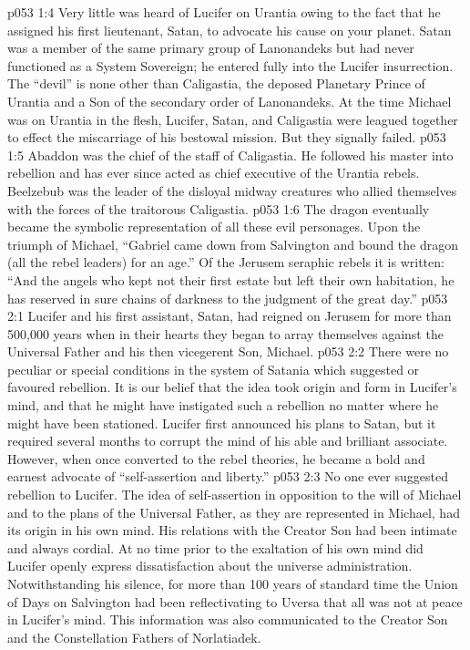 \vs p053 1:4 Very little was heard of Lucifer on Urantia owing to the fact that he assigned his first lieutenant, Satan, to advocate his cause on your planet. Satan was a member of the same primary group of Lanonandeks but had never functioned as a System Sovereign; he entered fully into the Lucifer insurrection. The “devil” is none other than Caligastia, the deposed Planetary Prince of Urantia and a Son of the secondary order of Lanonandeks. At the time Michael was on Urantia in the flesh, Lucifer, Satan, and Caligastia were leagued together to effect the miscarriage of his bestowal mission. But they signally failed.
\vs p053 1:5 Abaddon was the chief of the staff of Caligastia. He followed his master into rebellion and has ever since acted as chief executive of the Urantia rebels. Beelzebub was the leader of the disloyal midway creatures who allied themselves with the forces of the traitorous Caligastia.
\vs p053 1:6 \pc The dragon eventually became the symbolic representation of all these evil personages. Upon the triumph of Michael, “Gabriel came down from Salvington and bound the dragon (all the rebel leaders) for an age.” Of the Jerusem seraphic rebels it is written: “And the angels who kept not their first estate but left their own habitation, he has reserved in sure chains of darkness to the judgment of the great day.”
\vs p053 2:1 Lucifer and his first assistant, Satan, had reigned on Jerusem for more than 500,000 years when in their hearts they began to array themselves against the Universal Father and his then vicegerent Son, Michael.
\vs p053 2:2 There were no peculiar or special conditions in the system of Satania which suggested or favoured rebellion. It is our belief that the idea took origin and form in Lucifer’s mind, and that he might have instigated such a rebellion no matter where he might have been stationed. Lucifer first announced his plans to Satan, but it required several months to corrupt the mind of his able and brilliant associate. However, when once converted to the rebel theories, he became a bold and earnest advocate of “self\hyp{}assertion and liberty.”
\vs p053 2:3 \pc No one ever suggested rebellion to Lucifer. The idea of self\hyp{}assertion in opposition to the will of Michael and to the plans of the Universal Father, as they are represented in Michael, had its origin in his own mind. His relations with the Creator Son had been intimate and always cordial. At no time prior to the exaltation of his own mind did Lucifer openly express dissatisfaction about the universe administration. Notwithstanding his silence, for more than 100 years of standard time the Union of Days on Salvington had been reflectivating to Uversa that all was not at peace in Lucifer’s mind. This information was also communicated to the Creator Son and the Constellation Fathers of Norlatiadek.
